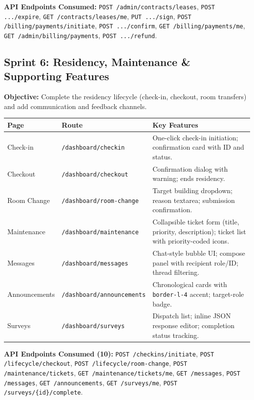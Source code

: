 \documentclass[12pt,a4paper]{article}
\begin{document}
\textbf{API Endpoints Consumed:} \texttt{POST /admin/contracts/leases}, \texttt{POST .../expire}, \texttt{GET /contracts/leases/me}, \texttt{PUT .../sign}, \texttt{POST /billing/payments/initiate}, \texttt{POST .../confirm}, \texttt{GET /billing/payments/me}, \texttt{GET /admin/billing/payments}, \texttt{POST .../refund}.


\subsection{Sprint 6: Residency, Maintenance \& Supporting Features}

\textbf{Objective:} Complete the residency lifecycle (check-in, checkout, room transfers) and add communication and feedback channels.

\begin{longtable}{p{3.5cm}p{3.5cm}p{6cm}}
\toprule
\textbf{Page} & \textbf{Route} & \textbf{Key Features} \\
\midrule
Check-in & \texttt{/dashboard/checkin} & One-click check-in initiation; confirmation card with ID and status. \\
Checkout & \texttt{/dashboard/checkout} & Confirmation dialog with warning; ends residency. \\
Room Change & \texttt{/dashboard/room-change} & Target building dropdown; reason textarea; submission confirmation. \\
Maintenance & \texttt{/dashboard/maintenance} & Collapsible ticket form (title, priority, description); ticket list with priority-coded icons. \\
Messages & \texttt{/dashboard/messages} & Chat-style bubble UI; compose panel with recipient role/ID; thread filtering. \\
Announcements & \texttt{/dashboard/announcements} & Chronological cards with \texttt{border-l-4} accent; target-role badge. \\
Surveys & \texttt{/dashboard/surveys} & Dispatch list; inline JSON response editor; completion status tracking. \\
\bottomrule
\end{longtable}

\textbf{API Endpoints Consumed (10):} \texttt{POST /checkins/initiate}, \texttt{POST /lifecycle/checkout}, \texttt{POST /lifecycle/room-change}, \texttt{POST /maintenance/tickets}, \texttt{GET /maintenance/tickets/me}, \texttt{GET /messages}, \texttt{POST /messages}, \texttt{GET /announcements}, \texttt{GET /surveys/me}, \texttt{POST /surveys/\{id\}/complete}.
\end{document}
